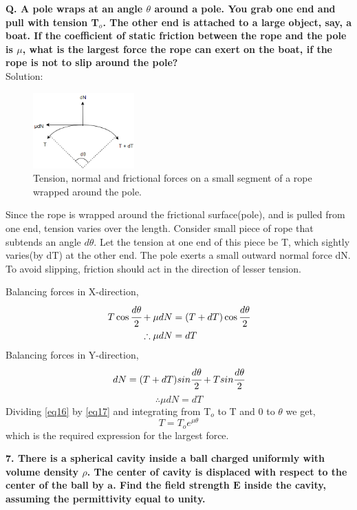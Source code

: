 \begin{tcolorbox}[colback=white]
\textbf{Q. A pole wraps at an angle $\theta$ around a pole. You grab one end and pull with tension T$_o$. The other end is attached to a large object, say, a boat. If the coefficient of static friction between the rope and the pole is $\mu$, what is the largest force the rope can exert on the boat, if the rope is not to slip around the pole?}\\
Solution:
\begin{figure}
     \centering 
     \includegraphics[width = 3.9cm,scale = 0.45]{figures/Sandesh's Figures/rppl.png}
     \caption{Tension, normal and frictional forces on a small segment of a rope wrapped around the pole. }
     \label{rppl}
 \end{figure}
 Since the rope is wrapped around the frictional surface(pole), and is pulled from one end, tension varies over the length. Consider small piece of rope that subtends an angle $d\theta$. Let the tension at  one end of this piece be T, which sightly varies(by dT) at the other end. The pole exerts a small outward normal force dN. To avoid slipping, friction should act in the direction of lesser tension.
 
Balancing forces in X-direction,
\begin{align} \label{eq16}
  T \cos\cfrac{d\theta}{2} + \mu dN &= (T + dT) \cos\cfrac{d\theta}{2}\nonumber\\
  \therefore \mu dN &= dT   
\end{align}
Balancing forces in Y-direction,
\begin{equation*} 
  dN = (T + dT) sin\cfrac{d\theta}{2} + T sin\cfrac{d\theta}{2}
\end{equation*}
\begin{equation}\label{eq17}
     \therefore \mu dN = dT
\end{equation}
Dividing \ref{eq16} by \ref{eq17} and integrating from T$_o$ to T and 0 to $\theta$ we get,
\[ T = T_o e^{\mu \theta}\]
which is the required expression for the largest force.
\end{tcolorbox}
\newpage
\begin{tcolorbox}
\textbf{7. There is a spherical cavity inside a ball charged uniformly with volume density $\rho$. The center of cavity is displaced with respect to the center of the ball by $\bm{a}$. Find the field strength $\bm{E}$ inside the cavity, assuming the permittivity equal to unity.}
\end{tcolorbox}

